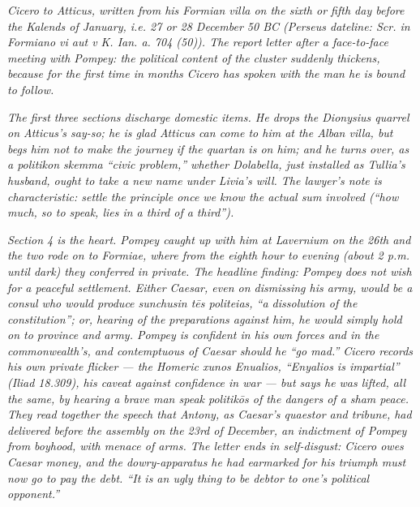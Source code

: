 
\textit{Cicero to Atticus, written from his Formian villa on
the sixth or fifth day before the Kalends of January, i.e.
27 or 28 December 50 BC (Perseus dateline:
\textit{Scr. in Formiano vi aut v K. Ian. a. 704 (50)}). The
report letter after a face-to-face meeting with Pompey: the
political content of the cluster suddenly thickens, because
for the first time in months Cicero has spoken with the man
he is bound to follow.}

\textit{The first three sections discharge domestic items.
He drops the Dionysius quarrel on Atticus's say-so; he is
glad Atticus can come to him at the Alban villa, but begs
him not to make the journey if the quartan is on him; and he
turns over, as a \emph{politikon skemma} ``civic problem,''
whether Dolabella, just installed as Tullia's husband, ought
to take a new name under Livia's will. The lawyer's note is
characteristic: settle the principle once we know the actual
sum involved (``how much, so to speak, lies in a third of a
third'').}

\textit{Section 4 is the heart. Pompey caught up with him at
Lavernium on the 26th and the two rode on to Formiae, where
from the eighth hour to evening (about 2 p.m. until dark)
they conferred in private. The headline finding: Pompey does
not wish for a peaceful settlement. Either Caesar, even on
dismissing his army, would be a consul who would produce
\emph{sunchusin tēs politeias}, ``a dissolution of the
constitution''; or, hearing of the preparations against him,
he would simply hold on to province and army. Pompey is
confident in his own forces and in the commonwealth's, and
contemptuous of Caesar should he ``go mad.'' Cicero records
his own private flicker --- the Homeric \emph{xunos
Enualios}, ``Enyalios is impartial'' (\emph{Iliad} 18.309),
his caveat against confidence in war --- but says he was
lifted, all the same, by hearing a brave man speak
\emph{politikōs} of the dangers of a sham peace. They read
together the speech that Antony, as Caesar's quaestor and
tribune, had delivered before the assembly on the 23rd of
December, an indictment of Pompey from boyhood, with menace
of arms. The letter ends in self-disgust: Cicero owes
Caesar money, and the dowry-apparatus he had earmarked for
his triumph must now go to pay the debt. ``It is an ugly
thing to be debtor to one's political opponent.''}
